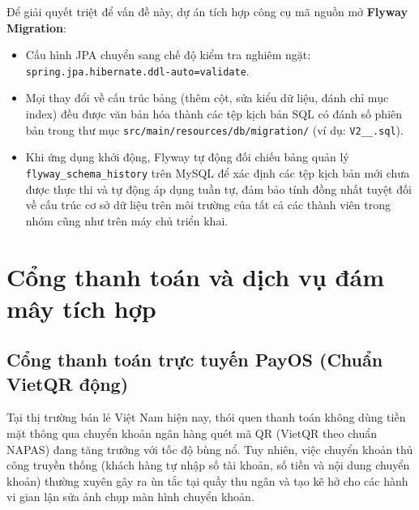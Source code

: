 Để giải quyết triệt để vấn đề này, dự án tích hợp công cụ mã nguồn mở \textbf{Flyway Migration}:
\begin{itemize}[leftmargin=1.5cm]
    \item Cấu hình JPA chuyển sang chế độ kiểm tra nghiêm ngặt: \texttt{spring.jpa.hibernate.ddl-auto=validate}.
    \item Mọi thay đổi về cấu trúc bảng (thêm cột, sửa kiểu dữ liệu, đánh chỉ mục index) đều được văn bản hóa thành các tệp kịch bản SQL có đánh số phiên bản trong thư mục \texttt{src/main/resources/db/migration/} (ví dụ: \texttt{V2\_\_.sql}).
    \item Khi ứng dụng khởi động, Flyway tự động đối chiếu bảng quản lý \texttt{flyway\_schema\_history} trên MySQL để xác định các tệp kịch bản mới chưa được thực thi và tự động áp dụng tuần tự, đảm bảo tính đồng nhất tuyệt đối về cấu trúc cơ sở dữ liệu trên môi trường của tất cả các thành viên trong nhóm cũng như trên máy chủ triển khai.
\end{itemize}

\section{Cổng thanh toán và dịch vụ đám mây tích hợp}
\label{sec:cong_thanh_toan_cloud}

\subsection{Cổng thanh toán trực tuyến PayOS (Chuẩn VietQR động)}
Tại thị trường bán lẻ Việt Nam hiện nay, thói quen thanh toán không dùng tiền mặt thông qua chuyển khoản ngân hàng quét mã QR (VietQR theo chuẩn NAPAS) đang tăng trưởng với tốc độ bùng nổ. Tuy nhiên, việc chuyển khoản thủ công truyền thống (khách hàng tự nhập số tài khoản, số tiền và nội dung chuyển khoản) thường xuyên gây ra ùn tắc tại quầy thu ngân và tạo kẽ hở cho các hành vi gian lận sửa ảnh chụp màn hình chuyển khoản.

